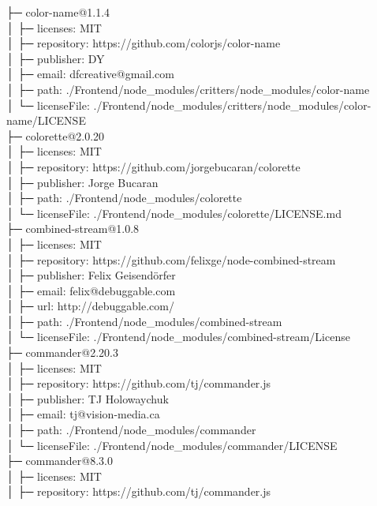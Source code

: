 \documentclass[
    paper=a4,
    twoside=false,
    parskip=half,
    listof=entryprefix,
    listof=totoc,
    index=totoc,
    bibliography=totoc,
    headsepline,
]{scrbook}
\begin{document}
    ├─ color-name@1.1.4\\
    │  ├─ licenses: MIT\\
    │  ├─ repository: https://github.com/colorjs/color-name\\
    │  ├─ publisher: DY\\
    │  ├─ email: dfcreative@gmail.com\\
    │  ├─ path: ./Frontend/node\_modules/critters/node\_modules/color-name\\
    │  └─ licenseFile: ./Frontend/node\_modules/critters/node\_modules/color-name/LICENSE\\
    ├─ colorette@2.0.20\\
    │  ├─ licenses: MIT\\
    │  ├─ repository: https://github.com/jorgebucaran/colorette\\
    │  ├─ publisher: Jorge Bucaran\\
    │  ├─ path: ./Frontend/node\_modules/colorette\\
    │  └─ licenseFile: ./Frontend/node\_modules/colorette/LICENSE.md\\
    ├─ combined-stream@1.0.8\\
    │  ├─ licenses: MIT\\
    │  ├─ repository: https://github.com/felixge/node-combined-stream\\
    │  ├─ publisher: Felix Geisendörfer\\
    │  ├─ email: felix@debuggable.com\\
    │  ├─ url: http://debuggable.com/\\
    │  ├─ path: ./Frontend/node\_modules/combined-stream\\
    │  └─ licenseFile: ./Frontend/node\_modules/combined-stream/License\\
    ├─ commander@2.20.3\\
    │  ├─ licenses: MIT\\
    │  ├─ repository: https://github.com/tj/commander.js\\
    │  ├─ publisher: TJ Holowaychuk\\
    │  ├─ email: tj@vision-media.ca\\
    │  ├─ path: ./Frontend/node\_modules/commander\\
    │  └─ licenseFile: ./Frontend/node\_modules/commander/LICENSE\\
    ├─ commander@8.3.0\\
    │  ├─ licenses: MIT\\
    │  ├─ repository: https://github.com/tj/commander.js\\
\end{document}
